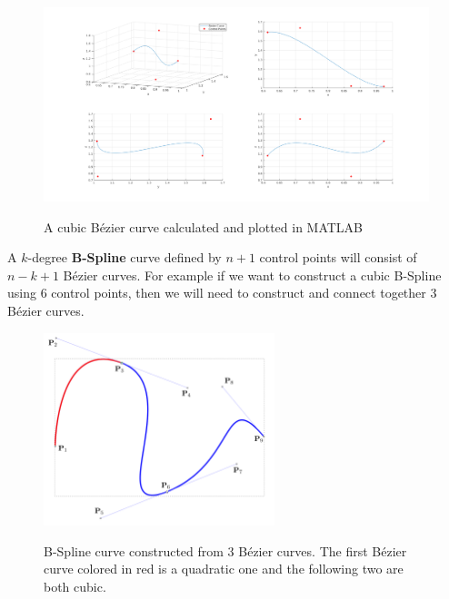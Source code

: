 \begin{center}
\begin{figure}[H]
\centering
\includegraphics[width=\textwidth]{images/bezier_path.png}\\
\caption{A cubic B\'ezier curve calculated and plotted in MATLAB} 
\end{figure}
\end{center}

A $k$-degree \textbf{B-Spline} curve defined by $n+1$ control points will consist of $n-k+1$ B\'ezier curves. For example if we want to construct a cubic B-Spline using 6 control points, then we will need to construct 
and connect together 3 B\'ezier curves.

\begin{center}
\begin{figure}[H]
\centering
\includegraphics[width=0.6\textwidth]{images/b-spline-explanation.png}\\
\caption{B-Spline curve constructed from 3 B\'ezier curves. The first B\'ezier curve colored in red is a quadratic one and the following two are both cubic.} 
\label{b-spline-explanation}
\end{figure}
\end{center}

